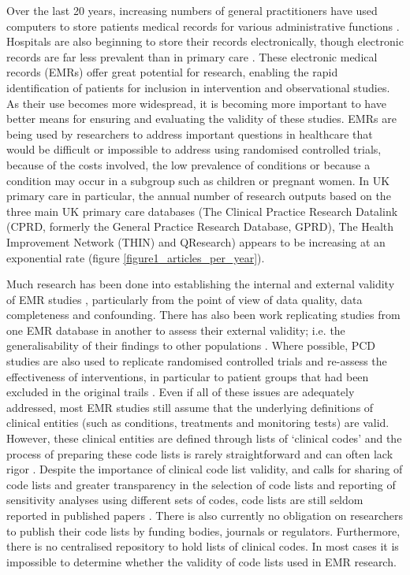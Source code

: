 \documentclass[10pt]{article}
\begin{document}
Over the last 20 years, increasing numbers of general practitioners have used computers to store patients medical records for various administrative functions \cite{Purves1996}. Hospitals are also beginning to store their records electronically, though electronic records are far less prevalent than in primary care \cite{Ashish2009}. These electronic medical records (EMRs) offer great potential for research, enabling the rapid identification of patients for inclusion in intervention and observational studies. As their use becomes more widespread, it is becoming more important to have better means for ensuring and evaluating the validity of these studies. EMRs are being used by researchers to address important questions in healthcare that would be difficult or impossible to address using randomised controlled trials, because of the costs involved, the low prevalence of conditions or because a condition may occur in a subgroup such as children or pregnant women. In UK primary care in particular, the annual number of research outputs based on the three main UK primary care databases (The Clinical Practice Research Datalink (CPRD, formerly the General Practice Research Database, GPRD), The Health Improvement Network (THIN) and QResearch) appears to be increasing at an exponential rate (figure \ref{figure1_articles_per_year}). 


Much research has been done into establishing the internal and external validity of EMR studies \cite{Herrett2010}, particularly from the point of view of data quality, data completeness and confounding.  There has also been work replicating studies from one EMR database in another to assess their external validity; i.e. the generalisability of their findings to other populations \cite{Hippisley-Cox2008, Vinogradova2013, Reeves2014}.  Where possible, PCD studies are also used to replicate randomised controlled trials and re-assess the effectiveness of interventions, in particular to patient groups that had been excluded in the original trails \cite{Tannen2008, Tannen2009}. Even if all of these issues are adequately addressed, most EMR studies still assume that the underlying definitions of clinical entities (such as conditions, treatments and monitoring tests) are valid.  However, these clinical entities are defined through lists of `clinical codes' and the process of preparing these code lists is rarely straightforward and can often lack rigor \cite{Dave2009}.  Despite the importance of clinical code list validity, and calls for sharing of code lists and greater transparency in the selection of code lists and reporting of sensitivity analyses using different sets of codes\cite{Gulliford2009, Bhattarai2012}, code lists are still seldom reported in published papers \cite{Herrett2010}.  There is also currently no obligation on researchers to publish their code lists by funding bodies, journals or regulators.  Furthermore, there is no centralised repository to hold lists of clinical codes. In most cases it is impossible to determine whether the validity of code lists used in EMR research. 
\end{document}
